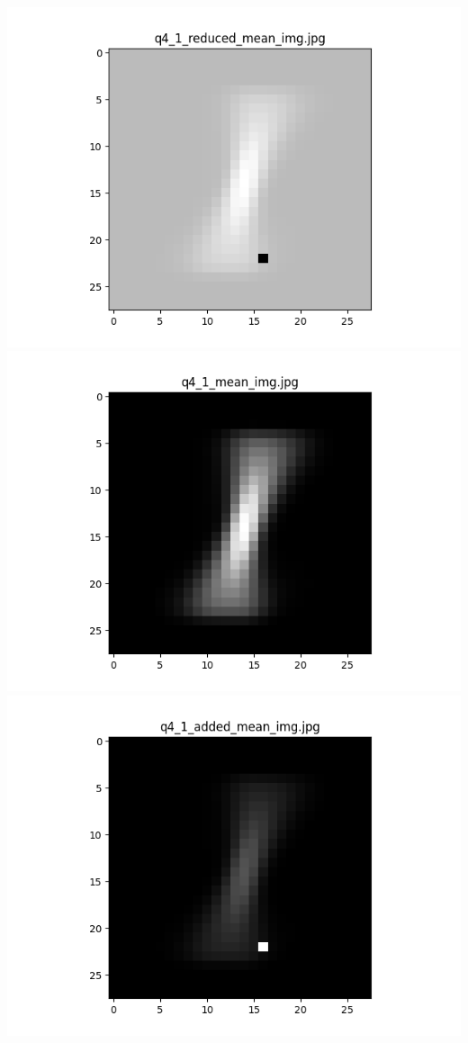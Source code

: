 \documentclass{article}
\begin{document}
    \\
    \includegraphics[scale=.37]{../results/q4/reduced_mean_images/q4_1_reduced_mean_img.png}
    \includegraphics[scale=.37]{../results/q4/mean_images/q4_1_mean_img.png}
    \includegraphics[scale=.37]{../results/q4/added_mean_images/q4_1_added_mean_img.png}
\end{document}
